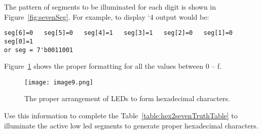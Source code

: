 The pattern of segments to be illuminated for each digit is shown in
Figure~\ref{fig:sevenSeg}. For example, to display `4 output would be:

\begin{verbatim}
seg[6]=0   seg[5]=0   seg[4]=1   seg[3]=1   seg[2]=0   seg[1]=0   seg[0]=1
or seg = 7'b0011001
\end{verbatim}

Figure~\ref{fig:sevenSegChars} shows the proper formatting for all the values between 0 -- f.

\begin{figure}[ht]
\texttt{[image: image9.png]}
\caption{The proper arrangement of LEDs to form hexadecimal characters.}
\label{fig:sevenSegChars}
\end{figure}

Use this information to 
  complete the Table~\ref{table:hex2sevenTruthTable} to illuminate the active low led segments
  to generate proper hexadecimal characters. 

